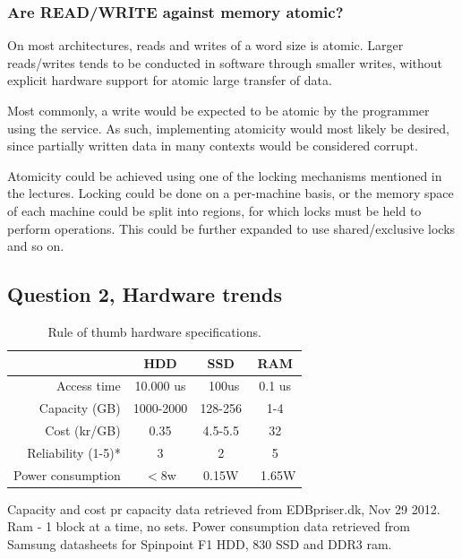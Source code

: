\documentclass[11pt,a4paper]{article}
\begin{document}
\subsubsection{Are READ/WRITE against memory atomic?}
On most architectures, reads and writes of a word size is atomic. Larger 
reads/writes tends to be conducted in software through smaller writes,
without explicit hardware support for atomic large transfer of data.

Most commonly, a write would be expected to be atomic by the programmer using
the service. As such, implementing atomicity would most likely be desired, since
partially written data in many contexts would be considered corrupt.

Atomicity could be achieved using one of the locking mechanisms mentioned
in the lectures. Locking could be done on a per-machine basis, or the
memory space of each machine could be split into regions, for which locks
must be held to perform operations. This could be further expanded to use
shared/exclusive locks and so on.

\subsection{Question 2, Hardware trends}

\begin{table}[h!]
    \centering

    \begin{tabular}{|r|c|c|c|}
        \hline
                        & HDD & SSD & RAM\\\hline
        Access time     & 10.000 us & ~100us & 0.1 us\\\hline %
        Capacity (GB)   & 1000-2000 & 128-256 & 1-4 \\\hline
        Cost (kr/GB)    & 0.35 & 4.5-5.5 & 32 \\\hline
        Reliability (1-5)*& 3 & 2 & 5\\\hline %
        Power consumption & $<$8w & 0.15W & ~1.65W \\\hline 
        
    \end{tabular}
    \caption{Rule of thumb hardware specifications.}
\end{table}
Capacity and cost pr capacity data retrieved from EDBpriser.dk, Nov 29 2012.
Ram - 1 block at a time, no sets. Power consumption data retrieved from Samsung datasheets for
Spinpoint F1 HDD, 830 SSD and DDR3 ram.
\end{document}
